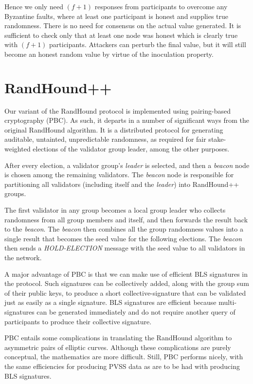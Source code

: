 \documentclass[8pt,fleqn,openany]{book}
\begin{document}
Hence we only need $(f + 1)$ responses from participants to overcome any Byzantine faults, where at least one participant is honest and supplies true randomness. There is no need for consensus on the actual value generated. It is sufficient to check only that at least one node was honest which is clearly true with $(f + 1)$ participants. Attackers can perturb the final value, but it will still become an honest random value by virtue of the inoculation property.

\section{RandHound++}
Our variant of the RandHound protocol is implemented using pairing-based cryptography (PBC). As such, it departs in a number of significant ways from the original RandHound algorithm. It is a distributed protocol for generating auditable, untainted, unpredictable randomness, as required for fair stake-weighted elections of the validator group leader, among the other purposes.

After every election, a validator group’s \textit{leader} is selected, and then a \textit{beacon} node is chosen among the remaining validators. The \textit{beacon} node is responsible for partitioning all validators (including itself and the \textit{leader}) into RandHound++ groups. 

The first validator in any group becomes a local group leader who collects randomness from all group members and itself, and then forwards the result back to the \textit{beacon}. The \textit{beacon} then combines all the group randomness values into a single result that becomes the seed value for the following elections. The \textit{beacon} then sends a \textit{HOLD-ELECTION} message with the seed value to all validators in the network.

A major advantage of PBC is that we can make use of efficient BLS signatures\cite{c16} in the protocol. Such signatures can be collectively added, along with the group sum of their public keys, to produce a short collective-signature that can be validated just as easily as a single signature. BLS signatures are efficient because multi-signatures can be generated immediately and do not require another query of participants to produce their collective signature.

PBC entails some complications in translating the RandHound algorithm to asymmetric pairs of elliptic curves. Although these complications are purely conceptual, the mathematics are more difficult. Still, PBC performs nicely, with the same efficiencies for producing PVSS data as are to be had with producing BLS signatures.
\end{document}
